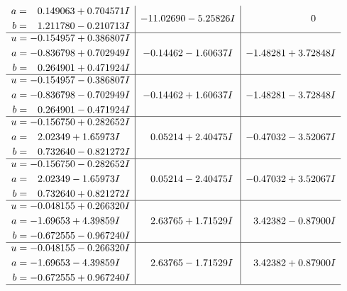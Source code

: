 \documentclass[1p]{elsarticle_modified}
\theoremstyle{definition}
\begin{document}
$$\begin{array}{c|c|c}
\begin{aligned}
a &= \phantom{-}0.149063 + 0.704571 I \\
b &= \phantom{-}1.211780 - 0.210713 I\end{aligned}
 & -11.02690 - 5.25826 I & \phantom{-0.000000 } 0 \\ \hline\begin{aligned}
u &= -0.154957 + 0.386807 I \\
a &= -0.836798 + 0.702949 I \\
b &= \phantom{-}0.264901 + 0.471924 I\end{aligned}
 & -0.14462 - 1.60637 I & -1.48281 + 3.72848 I \\ \hline\begin{aligned}
u &= -0.154957 - 0.386807 I \\
a &= -0.836798 - 0.702949 I \\
b &= \phantom{-}0.264901 - 0.471924 I\end{aligned}
 & -0.14462 + 1.60637 I & -1.48281 - 3.72848 I \\ \hline\begin{aligned}
u &= -0.156750 + 0.282652 I \\
a &= \phantom{-}2.02349 + 1.65973 I \\
b &= \phantom{-}0.732640 - 0.821272 I\end{aligned}
 & \phantom{-}0.05214 + 2.40475 I & -0.47032 - 3.52067 I \\ \hline\begin{aligned}
u &= -0.156750 - 0.282652 I \\
a &= \phantom{-}2.02349 - 1.65973 I \\
b &= \phantom{-}0.732640 + 0.821272 I\end{aligned}
 & \phantom{-}0.05214 - 2.40475 I & -0.47032 + 3.52067 I \\ \hline\begin{aligned}
u &= -0.048155 + 0.266320 I \\
a &= -1.69653 + 4.39859 I \\
b &= -0.672555 - 0.967240 I\end{aligned}
 & \phantom{-}2.63765 + 1.71529 I & \phantom{-}3.42382 - 0.87900 I \\ \hline\begin{aligned}
u &= -0.048155 - 0.266320 I \\
a &= -1.69653 - 4.39859 I \\
b &= -0.672555 + 0.967240 I\end{aligned}
 & \phantom{-}2.63765 - 1.71529 I & \phantom{-}3.42382 + 0.87900 I\\
 \hline 
 \end{array}$$\newpage\newpage\renewcommand{\arraystretch}{1}
\end{document}
